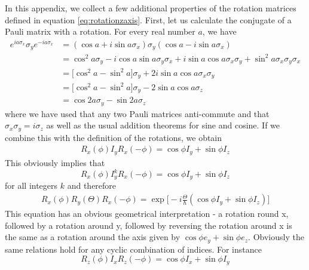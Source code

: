 \documentclass[a4paper, draft]{article}
\theoremstyle{own}
\theoremstyle{remark}
\begin{document}
In this appendix, we collect a few additional properties of the rotation matrices defined in equation \eqref{eq:rotationzaxis}. First, let us calculate the conjugate of a Pauli matrix with a rotation. For every real number $a$, we have
\begin{align*}
e^{ia\sigma_x} \sigma_y e^{-ia\sigma_x} &= (\cos a + i \sin a \sigma_x) \sigma_y (\cos a - i \sin a \sigma_x) \\&= \cos^2 a \sigma_y  -i \cos a \sin a \sigma_y \sigma_x 
+ i \sin a \cos a \sigma_x \sigma_y
+ \sin^2 a \sigma_x \sigma_y \sigma_x \\
&= \big[ \cos^2 a -\sin^2  a\big] \sigma_y + 2 i \sin a \cos a \sigma_x \sigma_y \\
&= \big[ \cos^2 a -\sin^2  a\big] \sigma_y - 2 \sin a \cos a \sigma_z \\
&= \cos 2a \sigma_y - \sin 2a \sigma_z
\end{align*}
where we have used that any two Pauli matrices anti-commute and that $\sigma_x \sigma_y = i \sigma_z$ as well as the usual addition theorems for sine and cosine. If we combine this with the definition of the rotations, we obtain
\begin{align}
\label{eq:infinitesimalsandwich}
R_x(\phi) I_y R_x(-\phi) = \cos \phi I_y + \sin \phi I_z
\end{align}
This obviously implies that
$$
R_x(\phi) I_y^k R_x(-\phi) = \cos \phi I_y + \sin \phi I_z
$$
for all integers $k$ and therefore
\begin{align}
R_x(\phi) R_y(\Theta) R_x(-\phi) = \exp 
\big[ -i \frac{\Theta}{\hbar} (\cos \phi I_y + \sin \phi I_z)      \big] 
\end{align}
This equation has an obvious geometrical interpretation - a rotation round x, followed by a rotation around y, followed by reversing the rotation around x is the same as a rotation around the axis given by $\cos \phi e_y + \sin \phi e_z$. Obviously the same relations hold for any cyclic combination of indices. For instance
$$
R_z(\phi) I_x R_z(-\phi) = \cos \phi I_x + \sin \phi I_y
$$
\end{document}
